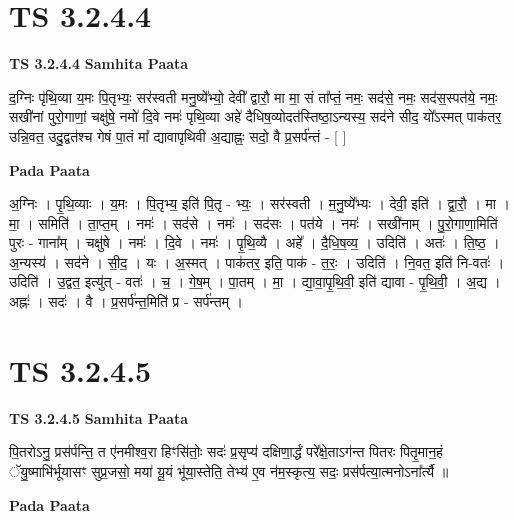 \documentclass[17pt]{extarticle}
\begin{document}
\section*{ TS 3.2.4.4 }

\textbf{TS 3.2.4.4 } \newline
\textbf{Samhita Paata} \newline

द॒ग्निः पृ॑थि॒व्या य॒मः पि॒तृभ्यः॒ सर॑स्वती मनु॒ष्ये᳚भ्यो॒ देवी᳚ द्वारौ॒ मा मा॒ सं ता᳚प्तं॒ नमः॒ सद॑से॒ नमः॒ सद॑स॒स्पत॑ये॒ नमः॒ सखी॑नां पुरो॒गाणां॒ चक्षु॑षे॒ नमो॑ दि॒वे नमः॑ पृथि॒व्या अहे॑ दैधिष॒व्योदत॑स्तिष्ठा॒ऽन्यस्य॒ सद॑ने सीद॒ यो᳚ऽस्मत् पाक॑तर॒ उन्नि॒वत॒ उदु॒द्वत॑श्च गेषं पा॒तं मा᳚ द्यावापृथिवी अ॒द्याह्नः॒ सदो॒ वै प्र॒सर्प॑न्तं - [  ] \newline

\textbf{Pada Paata} \newline

अ॒ग्निः । पृ॒थि॒व्याः । य॒मः । पि॒तृभ्य॒ इति॑ पि॒तृ - भ्यः॒ । सर॑स्वती । म॒नु॒ष्ये᳚भ्यः । देवी॒ इति॑ । द्वा॒रौ॒ । मा । मा॒ । समिति॑ । ता॒प्त॒म् । नमः॑ । सद॑से । नमः॑ । सद॑सः । पत॑ये । नमः॑ । सखी॑नाम् । पु॒रो॒गाणा॒मिति॑ पुरः - गाना᳚म् । चक्षु॑षे । नमः॑ । दि॒वे । नमः॑ । पृ॒थि॒व्यै । अहे᳚ । दै॒धि॒ष॒व्य॒ । उदिति॑ । अतः॑ । ति॒ष्ठ॒ । अ॒न्यस्य॑ । सद॑ने । सी॒द॒ । यः । अ॒स्मत् । पाक॑तर॒ इति॒ पाक॑ - त॒रः॒ । उदिति॑ । नि॒वत॒ इति॑ नि-वतः॑ । उदिति॑ । उ॒द्वत॒ इत्यु॑त् - वतः॑ । च॒ । गे॒ष॒म् । पा॒तम् । मा॒ । द्या॒वा॒पृ॒थि॒वी॒ इति॑ द्यावा - पृ॒थि॒वी॒ । अ॒द्य । अह्नः॑ । सदः॑ । वै । प्र॒सर्प॑न्त॒मिति॑ प्र - सर्प॑न्तम् ।  \newline




\section*{ TS 3.2.4.5 }

\textbf{TS 3.2.4.5 } \newline
\textbf{Samhita Paata} \newline

पि॒तरोऽनु॒ प्रस॑र्पन्ति॒ त ए॑नमीश्व॒रा हिꣳसि॑तोः॒ सदः॑ प्र॒सृप्य॑ दक्षिणा॒र्द्धं परे᳚क्षे॒ताऽग॑न्त पितरः पितृ॒मान॒हं ॅयु॒ष्माभि॑र्भूयासꣳ सुप्र॒जसो॒ मया॑ यू॒यं भू॑या॒स्तेति॒ तेभ्य॑ ए॒व न॑म॒स्कृत्य॒ सदः॒ प्रस॑र्पत्या॒त्मनोऽना᳚र्त्यै ॥ \newline

\textbf{Pada Paata} \newline
\end{document}
